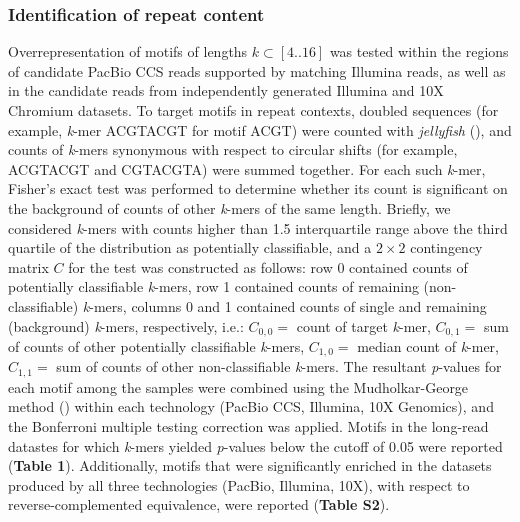 \documentclass{article}
\newcommand{\citep}[1]{(\cite{#1})}
\begin{document}
\subsubsection*{Identification of repeat content}
Overrepresentation of motifs of lengths $k \subset [4 .. 16]$ was tested within the regions of candidate PacBio CCS reads supported by matching Illumina reads, as well as in the candidate reads from independently generated Illumina and 10X Chromium datasets.
To target motifs in repeat contexts, doubled sequences (for example, \textit{k}-mer ACGTACGT for motif ACGT) were counted with \textit{jellyfish} \citep{jellyfish}, and counts of \textit{k}-mers synonymous with respect to circular shifts (for example, ACGTACGT and CGTACGTA) were summed together.
For each such \textit{k}-mer, Fisher's exact test was performed to determine whether its count is significant on the background of counts of other \textit{k}-mers of the same length.
Briefly, we considered \textit{k}-mers with counts higher than 1.5 interquartile range above the third quartile of the distribution as potentially classifiable, and a $2\times{}2$ contingency matrix $ C $ for the test was constructed as follows:
row 0 contained counts of potentially classifiable \textit{k}-mers,
row 1 contained counts of remaining (non-classifiable) \textit{k}-mers,
columns 0 and 1 contained counts of single and remaining (background) \textit{k}-mers, respectively,
i.e.:
$ C_{0,0} = $ {\rmfamily count of target \textit{k}-mer},
$ C_{0,1} = $ {\rmfamily sum of counts of other potentially classifiable \textit{k}-mers},
$ C_{1,0} = $ {\rmfamily median count of \textit{k}-mer},
$ C_{1,1} = $ {\rmfamily sum of counts of other non-classifiable \textit{k}-mers}.
The resultant \textit{p}-values for each motif among the samples were combined using the Mudholkar-George method \citep{george} within each technology (PacBio CCS, Illumina, 10X Genomics), and the Bonferroni multiple testing correction was applied.
Motifs in the long-read datastes for which \textit{k}-mers yielded \textit{p}-values below the cutoff of 0.05 were reported (\textbf{Table 1}).
Additionally, motifs that were significantly enriched in the datasets produced by all three technologies (PacBio, Illumina, 10X), with respect to reverse-complemented equivalence, were reported (\textbf{Table S2}).
\end{document}
